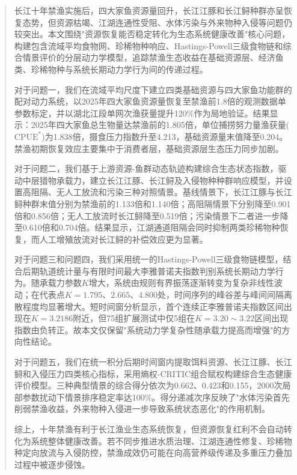 
\begin{abstract}
长江十年禁渔实施后，四大家鱼资源量回升，长江江豚和长江鲟种群亦呈恢复态势，但资源枯竭、江湖连通性受阻、水体污染与外来物种入侵等问题仍较突出。本文围绕"资源恢复能否稳定转化为生态系统健康改善"核心问题，构建包含流域平均食物网、珍稀物种响应、Hastings-Powell三级食物链和综合情景评价的分层动力学模型，追踪禁渔生态收益在基础资源层、经济鱼类、珍稀物种与系统长期动力学行为间的传递过程。

对于问题一，我们在流域平均尺度下建立四类基础资源与四大家鱼功能群的配对动力系统，以2025年四大家鱼资源量恢复至禁渔前1.8倍的观测数据单参数标定，并以湖北江段单网次渔获量提升120\%作为局地验证。结果显示：2025年四大家鱼总生物量达禁渔前的1.805倍，单位捕捞努力量渔获量($\mathrm{CPUE}^*$)为1.838倍，摄食压力指数升至4.213，基础资源量末值降至0.204。禁渔初期恢复效应主要集中于消费者层，基础资源层生态压力同步加剧。

对于问题二，我们基于上游资源-鱼群动态轨迹构建综合生态状态指数，驱动中层猎物承载力，建立长江江豚、长江鲟及入侵物种种群响应模型，并设置高阻隔、无人工放流和污染三种对照情景。基线情景下，长江江豚与长江鲟种群末值分别为禁渔前的1.133倍和1.140倍；高阻隔情景下分别降至0.901倍和0.856倍；无人工放流时长江鲟降至0.519倍；污染情景下二者进一步降至0.610倍和0.704倍。结果显示，江湖通道阻隔会同时抑制两类珍稀物种恢复，而人工增殖放流对长江鲟的补偿效应更为显著。

对于问题三和问题四，我们采用统一的Hastings-Powell三级食物链模型，结合后期轨道统计量与有限时间最大李雅普诺夫指数判别系统长期动力学行为。随承载力参数$K$增大，系统由规则有界振荡逐渐转变为复杂非线性波动；在代表点$K=1.795$、$2.665$、$4.800$处，时间序列的峰谷差与峰间间隔离散程度均显著增大。短时间窗分析显示，首个连续正李雅普诺夫指数区间出现在$K=3.2186$附近，但75组扩展测试中仅5组在$K=3.20\sim3.22$区间出现指数由负转正。故本文仅保留"系统动力学复杂性随承载力提高而增强"的方向性结论。

对于问题五，我们在统一积分后期时间窗内提取饵料资源、长江江豚、长江鲟和入侵压力四类核心指标，采用熵权-CRITIC组合赋权构建综合生态健康评价模型。三种典型情景的综合得分依次为0.662、0.423和0.155，2000次局部参数扰动下情景排序稳定率达100\%。得分递减次序反映了"水体污染首先削弱禁渔收益，外来物种入侵进一步导致系统状态恶化"的作用机制。

综上，十年禁渔有利于长江渔业生态系统恢复，但资源恢复红利不会自动转化为系统整体健康改善。若不同步推进水质治理、江湖连通性修复、珍稀物种定向放流与入侵防控，禁渔成效仍可能在向高营养级传递及多重压力叠加过程中被逐步侵蚀。
\end{abstract}

